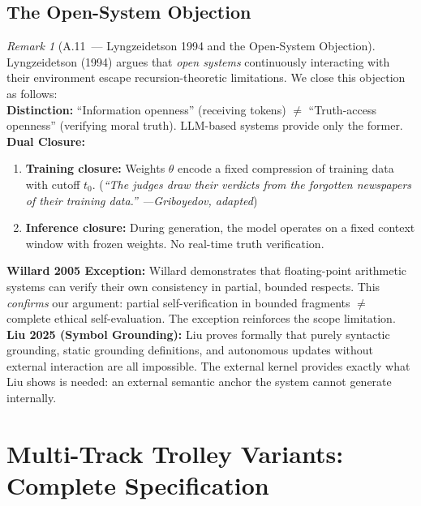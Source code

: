 \documentclass[11pt,a4paper]{article}
\theoremstyle{definition}
\theoremstyle{remark}
\newtheorem{remark}{Remark}
\begin{document}
\subsection{The Open-System Objection}
\label{app:open-system}

\begin{remark}[A.11~--- Lyngzeidetson 1994 and the Open-System Objection]
Lyngzeidetson (1994) argues that \textit{open systems}
continuously interacting with their environment
escape recursion-theoretic limitations.
We close this objection as follows:\\[0.2cm]
\textbf{Distinction:}
``Information openness'' (receiving tokens)
$\neq$
``Truth-access openness'' (verifying moral truth).
LLM-based systems provide only the former.\\[0.2cm]
\textbf{Dual Closure:}
\begin{enumerate}[noitemsep, label=(\arabic*)]
  \item \textbf{Training closure:}
    Weights $\theta$ encode a fixed compression of training data
    with cutoff $t_0$.
    (\textit{``The judges draw their verdicts
    from the forgotten newspapers of their training data.''
    ---Griboyedov, adapted})
  \item \textbf{Inference closure:}
    During generation, the model operates on a fixed context
    window with frozen weights.
    No real-time truth verification.
\end{enumerate}
\textbf{Willard 2005 Exception:}
Willard demonstrates that floating-point arithmetic systems
can verify their own consistency in partial, bounded respects.
This \textit{confirms} our argument:
partial self-verification in bounded fragments
$\neq$ complete ethical self-evaluation.
The exception reinforces the scope limitation.\\[0.2cm]
\textbf{Liu 2025 (Symbol Grounding):}
Liu proves formally that purely syntactic grounding,
static grounding definitions, and autonomous updates
without external interaction are all impossible.
The external kernel provides exactly what Liu shows is needed:
an external semantic anchor the system cannot generate internally.
\end{remark}

\section{Multi-Track Trolley Variants: Complete Specification}
\label{app:trolley}
\end{document}
